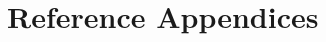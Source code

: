 \documentclass[
    12pt,
    a4paper,
    oneside,
    openany
]{book}
\begin{document}




\appendix

\part{Reference Appendices}



\end{document}
